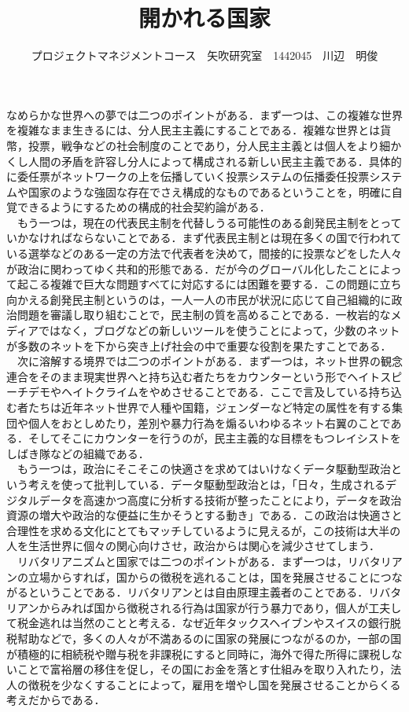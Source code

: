 \documentclass[uplatex,twocolumn,dvipdfmx]{jsarticle}
\title{\vspace{-5mm}\fontsize{14pt}{0pt}\selectfont 開かれる国家}
\author{\normalsize プロジェクトマネジメントコース　矢吹研究室　1442045　川辺　明俊}
\date{}
\begin{document}
\fontsize{10.5pt}{\baselineskip}\selectfont
\maketitle





なめらかな世界への夢では二つのポイントがある．まず一つは、この複雑な世界を複雑なまま生きるには、分人民主主義にすることである．複雑な世界とは貨幣，投票，戦争などの社会制度のことであり，分人民主主義とは個人をより細かくし人間の矛盾を許容し分人によって構成される新しい民主主義である．具体的に委任票がネットワークの上を伝播していく投票システムの伝播委任投票システムや国家のような強固な存在でさえ構成的なものであるということを，明確に自覚できるようにするための構成的社会契約論がある．\\
　もう一つは，現在の代表民主制を代替しうる可能性のある創発民主制をとっていかなければならないことである．まず代表民主制とは現在多くの国で行われている選挙などのある一定の方法で代表者を決めて，間接的に投票などをした人々が政治に関わってゆく共和的形態である．だが今のグローバル化したことによって起こる複雑で巨大な問題すべてに対応するには困難を要する．この問題に立ち向かえる創発民主制というのは，一人一人の市民が状況に応じて自己組織的に政治問題を審議し取り組むことで，民主制の質を高めることである．一枚岩的なメディアではなく，ブログなどの新しいツールを使うことによって，少数のネットが多数のネットを下から突き上げ社会の中で重要な役割を果たすことである．\\
　次に溶解する境界では二つのポイントがある．まず一つは，ネット世界の観念連合をそのまま現実世界へと持ち込む者たちをカウンターという形でヘイトスピーチデモやヘイトクライムをやめさせることである．ここで言及している持ち込む者たちは近年ネット世界で人種や国籍，ジェンダーなど特定の属性を有する集団や個人をおとしめたり，差別や暴力行為を煽るいわゆるネット右翼のことである．そしてそこにカウンターを行うのが，民主主義的な目標をもつレイシストをしばき隊などの組織である．\\
　もう一つは，政治にそこそこの快適さを求めてはいけなくデータ駆動型政治という考えを使って批判している．データ駆動型政治とは，「日々，生成されるデジタルデータを高速かつ高度に分析する技術が整ったことにより，データを政治資源の増大や政治的な便益に生かそうとする動き」である．この政治は快適さと合理性を求める文化にとてもマッチしているように見えるが，この技術は大半の人を生活世界に個々の関心向けさせ，政治からは関心を減少させてしまう．\\
　リバタリアニズムと国家では二つのポイントがある．まず一つは，リバタリアンの立場からすれば，国からの徴税を逃れることは，国を発展させることにつながるということである．リバタリアンとは自由原理主義者のことである．リバタリアンからみれば国から徴税される行為は国家が行う暴力であり，個人が工夫して税金逃れは当然のことと考える．なぜ近年タックスヘイブンやスイスの銀行脱税幇助などで，多くの人々が不満あるのに国家の発展につながるのか，一部の国が積極的に相続税や贈与税を非課税にすると同時に，海外で得た所得に課税しないことで富裕層の移住を促し，その国にお金を落とす仕組みを取り入れたり，法人の徴税を少なくすることによって，雇用を増やし国を発展させることからくる考えだからである．\\
\end{document}

